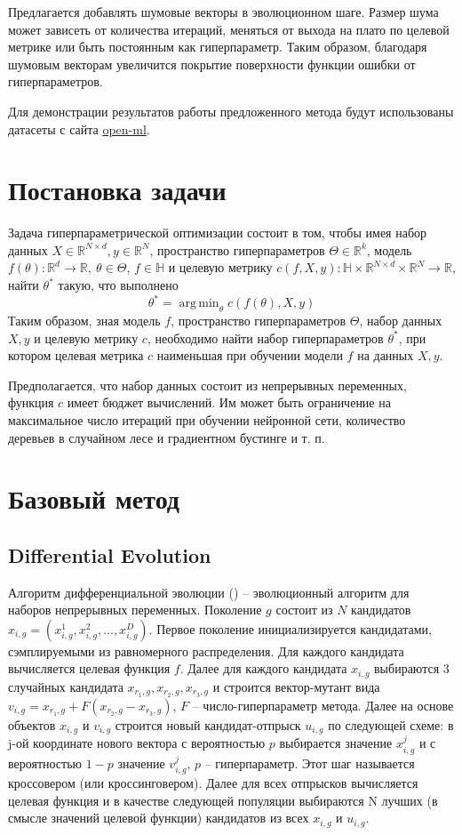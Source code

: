\documentclass{article}
\DeclareMathOperator*{\argmin}{arg\,min}
\begin{document}
Предлагается добавлять шумовые векторы в эволюционном шаге. Размер шума может зависеть от количества итераций, меняться от выхода на плато по целевой метрике или быть постоянным как гиперпараметр. Таким образом, благодаря шумовым векторам увеличится покрытие поверхности функции ошибки от гиперпараметров.

Для демонстрации результатов работы предложенного метода будут использованы датасеты с сайта \href{https://www.openml.org/}{open-ml}.


\section{Постановка задачи}
Задача гиперпараметрической оптимизации состоит в том, чтобы имея набор данных $X \in \mathbb{R}^{N\times d}, y \in \mathbb{R}^{N}$, пространство гиперпараметров $\Theta \in \mathbb{R}^k$, модель $f(\theta): \mathbb{R}^{d} \to \mathbb{R},\ \theta \in \Theta$, $f \in \mathbb{H}$ и целевую метрику $c(f, X, y): \mathbb{H} \times \mathbb{R}^{N\times d} \times \mathbb{R}^{N} \to \mathbb{R}$, найти $\theta^*$ такую, что выполнено
$$\theta^* = \argmin_{\theta} c(f(\theta), X, y)$$
Таким образом, зная модель $f$, пространство гиперпараметров $\Theta$, набор данных $X, y$ и целевую метрику $c$, необходимо найти набор гиперпараметров $\theta^*$, при котором целевая метрика $c$ наименьшая при обучении модели $f$ на данных $X, y$.

Предполагается, что набор данных состоит из непрерывных переменных, функция $c$ имеет бюджет вычислений. Им может быть ограничение на максимальное число итераций при обучении нейронной сети, количество деревьев в случайном лесе и градиентном бустинге и т. п.


\section{Базовый метод}
\subsection{Differential Evolution}
Алгоритм дифференциальной эволюции (\cite{de}) -- эволюционный алгоритм для наборов непрерывных переменных. Поколение $g$ состоит из $N$ кандидатов $x_{i, g} = (x_{i,g}^1, x_{i,g}^2, ..., x_{i,g}^D)$. Первое поколение инициализируется кандидатами, сэмплируемыми из равномерного распределения. Для каждого кандидата вычисляется целевая функция $f$. Далее для каждого кандидата $x_{i, g}$ выбираются 3 случайных кандидата  $x_{r_1, g}, x_{r_2, g}, x_{r_3, g}$ и строится вектор-мутант вида $v_{i, g} = x_{r_1, g} + F(x_{r_2, g} - x_{r_3, g})$, $F$ -- число-гиперпараметр метода. Далее на основе объектов $x_{i, g}$ и $v_{i, g}$ строится новый кандидат-отпрыск $u_{i, g}$ по следующей схеме: в j-ой координате нового вектора с вероятностью $p$ выбирается значение $x_{i, g}^j$ и с вероятностью $1 - p$ значение $v_{i, g}^j$, $p$ -- гиперпараметр. Этот шаг называется кроссовером (или кроссинговером). Далее для всех отпрысков вычисляется целевая функция и в качестве следующей популяции выбираются N лучших (в смысле значений целевой функции) кандидатов из всех $x_{i, g}$ и $u_{i, g}$.
\end{document}
